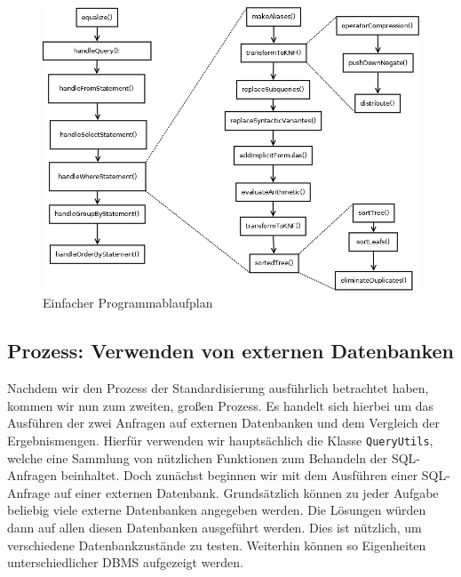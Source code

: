 \begin{figure}[h]
\centering
\includegraphics[scale=0.39]{Bilder/execPlan.png}
\caption{Einfacher Programmablaufplan}
\label{fig:execPlan}
\end{figure}

\subsection*{Prozess: Verwenden von externen Datenbanken} 

Nachdem wir den Prozess der Standardisierung ausführlich betrachtet haben, kommen wir nun zum zweiten, großen Prozess. Es handelt sich hierbei um das Ausführen der zwei Anfragen auf externen Datenbanken und dem Vergleich der Ergebnismengen. Hierfür verwenden wir hauptsächlich die Klasse \verb|QueryUtils|, welche eine Sammlung von nützlichen Funktionen zum Behandeln der SQL-Anfragen beinhaltet. Doch zunächst beginnen wir mit dem Ausführen einer SQL-Anfrage auf einer externen Datenbank. Grundsätzlich können zu jeder Aufgabe beliebig viele externe Datenbanken angegeben werden. Die Lösungen würden dann auf allen diesen Datenbanken ausgeführt werden. Dies ist nützlich, um verschiedene Datenbankzustände zu testen. Weiterhin können so Eigenheiten unterschiedlicher DBMS aufgezeigt werden. 

